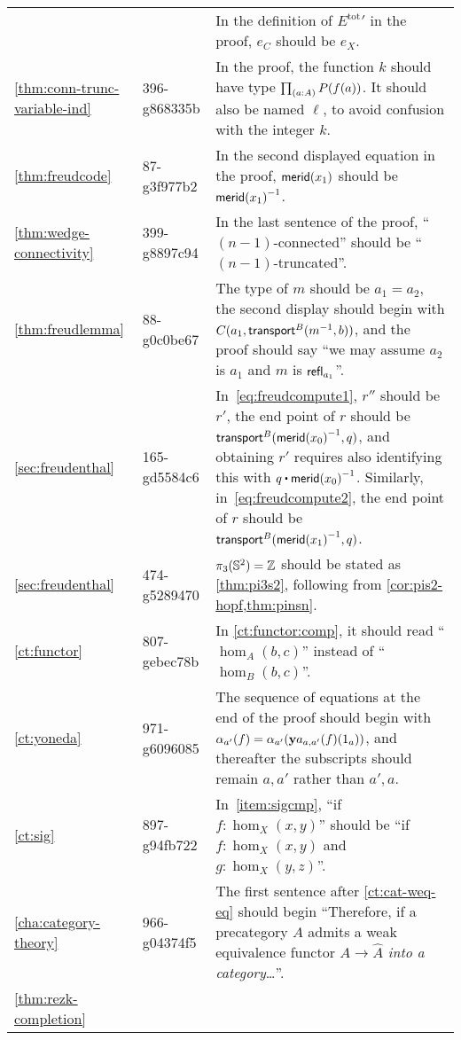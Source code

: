 \documentclass[
%
%
11pt %
]{article}
\begin{document}
\begin{longtable}{llp{10.5cm}}
  & %
  & In the definition of ${E^{\mathrm{tot}}}'$ in the proof, $e_C$ should be $e_X$.\\
  \cref{thm:conn-trunc-variable-ind}
  & 396-g868335b
  & In the proof, the function $k$ should have type $\prd{a:A} P(f(a))$.
  It should also be named $\ell$, to avoid confusion with the integer $k$.\\
  \cref{thm:freudcode}
  & 87-g3f977b2
  & In the second displayed equation in the proof, $\mathsf{merid}(x_1)$ should be $\mathord{{\mathsf{merid}(x_1)}^{-1}}$.\\
  \cref{thm:wedge-connectivity}
  & 399-g8897c94
  & In the last sentence of the proof, ``$(n-1)$-connected'' should be ``$(n-1)$-truncated''.\\
  \cref{thm:freudlemma}
  & 88-g0c0be67
  & The type of $m$ should be $a_1=a_2$, the second display should begin with $C(a_1,\mathsf{transport}^{B}(\mathord{{m}^{-1}},b))$, and the proof should say ``we may assume $a_2$ is $a_1$ and $m$ is $\mathsf{refl}_{a_1}$''.\\
  \cref{sec:freudenthal}
  & 165-gd5584c6
  & In~\eqref{eq:freudcompute1}, $r''$ should be $r'$, the end point of $r$ should be $\mathsf{transport}^{B}(\mathord{{\mathsf{merid}(x_0)}^{-1}},q)$, and obtaining $r'$ requires also identifying this with $q \ct \opp{\merid(x_0)}$.
  Similarly, in~\eqref{eq:freudcompute2}, the end point of $r$ should be $\mathsf{transport}^{B}(\mathord{{\mathsf{merid}(x_1)}^{-1}},q)$.\\
  \cref{sec:freudenthal}
  & 474-g5289470
  & $\pi_3(\mathbb{S}^2)=\mathbb{Z}$ should be stated as \cref{thm:pi3s2}, following from \cref{cor:pis2-hopf,thm:pinsn}.\\
  \cref{ct:functor}
  & 807-gebec78b
  & In \cref{ct:functor:comp}, it should read ``$\hom_A(b,c)$'' instead of ``$\hom_B(b,c)$''.\\
  \cref{ct:yoneda}
  & 971-g6096085
  & The sequence of equations at the end of the proof should begin with $\alpha_{a'}(f) = \alpha_{a'} (\mathbf{y} a_{a,a'}(f)(1_a))$, and thereafter the subscripts should remain $a,a'$ rather than $a',a$.\\
  \cref{ct:sig}
  & 897-g94fb722
  & In~\ref{item:sigcmp}, ``if $f:\hom_X(x,y)$'' should be ``if $f:\hom_X(x,y)$ and $g:\hom_X(y,z)$''.\\
  \cref{cha:category-theory}
  & 966-g04374f5
  & The first sentence after \cref{ct:cat-weq-eq} should begin ``Therefore, if a precategory $A$ admits a weak equivalence functor $A\to \widehat{A}$ \emph{into a category}\dots''.\\
  \cref{thm:rezk-completion}

\end{longtable}
\end{document}
